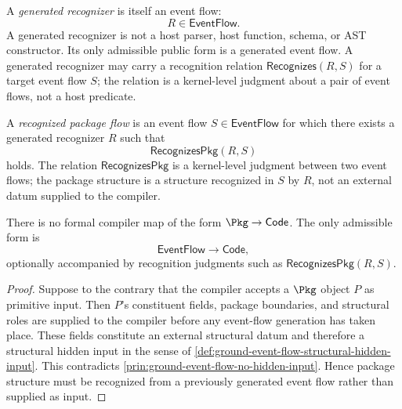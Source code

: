 \begin{definition}
\label{def:ground-event-flow-generated-recognizer}
A \emph{generated recognizer} is itself an event flow:
$$
  R \in \mathsf{EventFlow}.
$$
A generated recognizer is not a host parser, host function, schema, or AST constructor. Its only admissible public form is a generated event flow. A generated recognizer may carry a recognition relation $\mathsf{Recognizes}(R, S)$ for a target event flow $S$; the relation is a kernel-level judgment about a pair of event flows, not a host predicate.
\end{definition}

\begin{definition}
\label{def:ground-event-flow-recognized-package-flow}
A \emph{recognized package flow} is an event flow $S \in \mathsf{EventFlow}$ for which there exists a generated recognizer $R$ such that
$$
  \mathsf{RecognizesPkg}(R, S)
$$
holds. The relation $\mathsf{RecognizesPkg}$ is a kernel-level judgment between two event flows; the package structure is a structure recognized in $S$ by $R$, not an external datum supplied to the compiler.
\end{definition}

\begin{proposition}
\label{prop:ground-event-flow-package-not-primitive}
There is no formal compiler map of the form $\Pkg \to \mathsf{Code}$. The only admissible form is
$$
  \mathsf{EventFlow} \longrightarrow \mathsf{Code},
$$
optionally accompanied by recognition judgments such as $\mathsf{RecognizesPkg}(R, S)$.
\end{proposition}

\begin{proof}
Suppose to the contrary that the compiler accepts a $\Pkg$ object $P$ as primitive input. Then $P$'s constituent fields, package boundaries, and structural roles are supplied to the compiler before any event-flow generation has taken place. These fields constitute an external structural datum and therefore a structural hidden input in the sense of \autoref{def:ground-event-flow-structural-hidden-input}. This contradicts \autoref{prin:ground-event-flow-no-hidden-input}. Hence package structure must be recognized from a previously generated event flow rather than supplied as input.
\end{proof}

